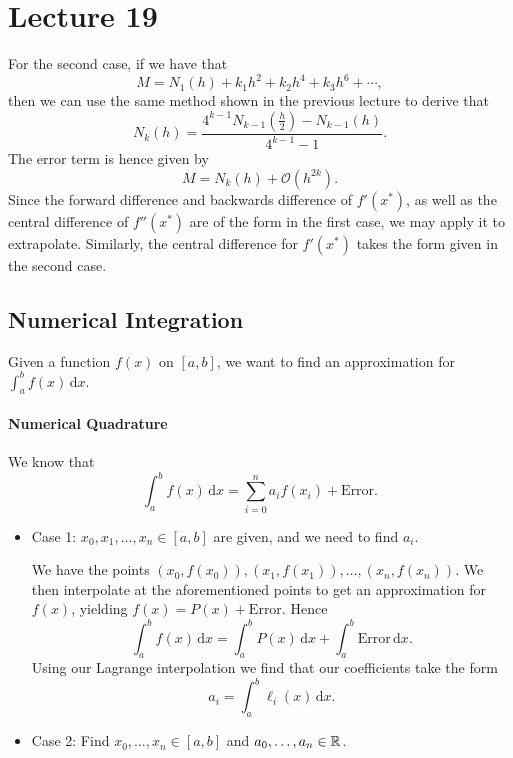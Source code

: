 \documentclass[class=article, crop=false]{standalone}
\begin{document}
  \section{Lecture 19}
  For the second case, if we have that
  \[
    M = N_1(h) + k_1h^2 + k_2h^4 + k_3h^6 + \dotsb,
  \]
  then we can use the same method shown in the previous lecture to derive that
  \[
    N_k(h) = \frac{4^{k - 1}N_{k - 1}(\frac{h}{2}) - N_{k - 1}(h)}{4^{k - 1} - 1}.
  \]
  The error term is hence given by
  \[
    M = N_k(h) + \mathcal{O}(h^{2k}).
  \]
  Since the forward difference and backwards difference of $f'(x^*)$, as well as the central difference of $f''(x^*)$ are of the form in the first case, we may apply it to extrapolate. Similarly, the central difference for $f'(x^*)$ takes the form given in the second case.
  \subsection{Numerical Integration}
  Given a function $f(x)$ on $[a, b]$, we want to find an approximation for $\int_{a}^{b}f(x) \,\mathrm dx$. \par
  \paragraph{Numerical Quadrature}
  We know that
  \[
    \int_{a}^{b}f(x) \,\mathrm dx = \sum_{i=0}^{n} a_if(x_i) + \text{Error}.
  \]
  \begin{itemize}
    \item Case 1: $x_0,x_1,\dotsc,x_n\in [a, b]$ are given, and we need to find $a_i$. \par
    We have the points $(x_0, f(x_0)), (x_1, f(x_1)),\dotsc,(x_n, f(x_n))$. We then interpolate at the aforementioned points to get an approximation for $f(x)$, yielding $f(x) = P(x) + \text{Error}$. Hence
    \[
      \int_{a}^{b}f(x) \,\mathrm dx = \int_{a}^{b}P(x) \,\mathrm dx + \int_{a}^{b}\text{Error} \,\mathrm dx.
    \]
    Using our Lagrange interpolation we find that our coefficients take the form
    \[
      a_i = \int_{a}^{b}\ell_i(x) \,\mathrm dx.
    \]
    \item Case 2: Find $x_0,\dotsc,x_n\in [a, b]$ and $a_0,\dotsc,a_n\in\mathbb{R}$.
  \end{itemize}
\end{document}
